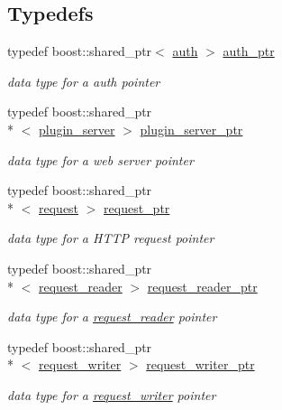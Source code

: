 \subsection*{Typedefs}
\begin{DoxyCompactItemize}
\item 
typedef boost\-::shared\-\_\-ptr$<$ \hyperlink{classpion_1_1http_1_1auth}{auth} $>$ \hyperlink{namespacepion_1_1http_ad4fb4365aa7da70980fe02dfb13773e4}{auth\-\_\-ptr}
\begin{DoxyCompactList}\small\item\em data type for a auth pointer \end{DoxyCompactList}\item 
typedef boost\-::shared\-\_\-ptr\\*
$<$ \hyperlink{classpion_1_1http_1_1plugin__server}{plugin\-\_\-server} $>$ \hyperlink{namespacepion_1_1http_a6ac91682b45c496ba05545e5f21a3dbd}{plugin\-\_\-server\-\_\-ptr}
\begin{DoxyCompactList}\small\item\em data type for a web server pointer \end{DoxyCompactList}\item 
typedef boost\-::shared\-\_\-ptr\\*
$<$ \hyperlink{classpion_1_1http_1_1request}{request} $>$ \hyperlink{namespacepion_1_1http_ace432b70a9459d50ff4969a7a47f0ccb}{request\-\_\-ptr}
\begin{DoxyCompactList}\small\item\em data type for a H\-T\-T\-P request pointer \end{DoxyCompactList}\item 
typedef boost\-::shared\-\_\-ptr\\*
$<$ \hyperlink{classpion_1_1http_1_1request__reader}{request\-\_\-reader} $>$ \hyperlink{namespacepion_1_1http_ac22c195ee38fecd79d9330c4099ce3e9}{request\-\_\-reader\-\_\-ptr}
\begin{DoxyCompactList}\small\item\em data type for a \hyperlink{classpion_1_1http_1_1request__reader}{request\-\_\-reader} pointer \end{DoxyCompactList}\item 
typedef boost\-::shared\-\_\-ptr\\*
$<$ \hyperlink{classpion_1_1http_1_1request__writer}{request\-\_\-writer} $>$ \hyperlink{namespacepion_1_1http_afe361f478f250aac9900197f37176428}{request\-\_\-writer\-\_\-ptr}
\begin{DoxyCompactList}\small\item\em data type for a \hyperlink{classpion_1_1http_1_1request__writer}{request\-\_\-writer} pointer \end{DoxyCompactList}\item 

\end{DoxyCompactItemize}
